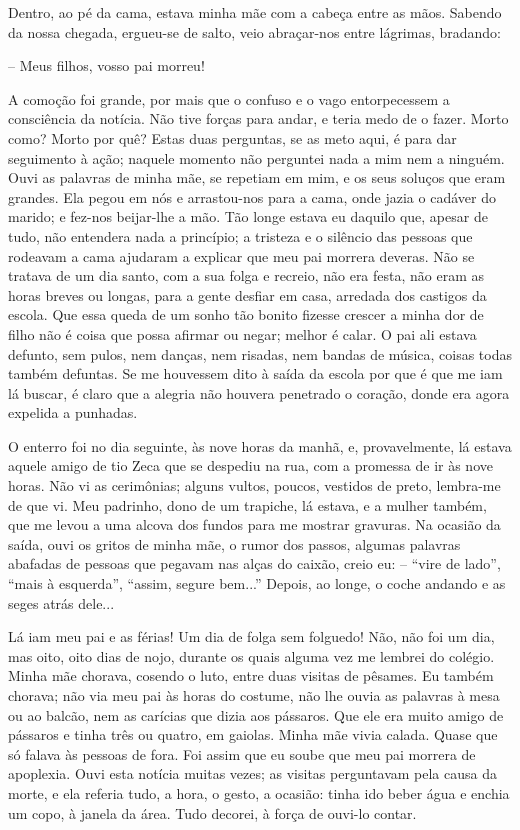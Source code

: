 Dentro, ao pé da cama, estava minha mãe com a cabeça entre as mãos.
Sabendo da nossa chegada, ergueu-se de salto, veio abraçar-nos entre
lágrimas, bradando:

-- Meus filhos, vosso pai morreu!

A comoção foi grande, por mais que o confuso e o vago entorpecessem a
consciência da notícia. Não tive forças para andar, e teria medo de o
fazer. Morto como? Morto por quê? Estas duas perguntas, se as meto aqui,
é para dar seguimento à ação; naquele momento não perguntei nada a mim
nem a ninguém. Ouvi as palavras de minha mãe, se repetiam em mim, e os
seus soluços que eram grandes. Ela pegou em nós e arrastou-nos para a
cama, onde jazia o cadáver do marido; e fez-nos beijar-lhe a mão. Tão
longe estava eu daquilo que, apesar de tudo, não entendera nada a
princípio; a tristeza e o silêncio das pessoas que rodeavam a cama
ajudaram a explicar que meu pai morrera deveras. Não se tratava de um
dia santo, com a sua folga e recreio, não era festa, não eram as horas
breves ou longas, para a gente desfiar em casa, arredada dos castigos da
escola. Que essa queda de um sonho tão bonito fizesse crescer a minha
dor de filho não é coisa que possa afirmar ou negar; melhor é calar. O
pai ali estava defunto, sem pulos, nem danças, nem risadas, nem bandas
de música, coisas todas também defuntas. Se me houvessem dito à saída da
escola por que é que me iam lá buscar, é claro que a alegria não houvera
penetrado o coração, donde era agora expelida a punhadas.

O enterro foi no dia seguinte, às nove horas da manhã, e, provavelmente,
lá estava aquele amigo de tio Zeca que se despediu na rua, com a
promessa de ir às nove horas. Não vi as cerimônias; alguns vultos,
poucos, vestidos de preto, lembra-me de que vi. Meu padrinho, dono de um
trapiche, lá estava, e a mulher também, que me levou a uma alcova dos
fundos para me mostrar gravuras. Na ocasião da saída, ouvi os gritos de
minha mãe, o rumor dos passos, algumas palavras abafadas de pessoas que
pegavam nas alças do caixão, creio eu: -- ``vire de lado'', ``mais à
esquerda'', ``assim, segure bem...'' Depois, ao longe, o coche andando e
as seges atrás dele...

Lá iam meu pai e as férias! Um dia de folga sem folguedo! Não, não foi
um dia, mas oito, oito dias de nojo, durante os quais alguma vez me
lembrei do colégio. Minha mãe chorava, cosendo o luto, entre duas
visitas de pêsames. Eu também chorava; não via meu pai às horas do
costume, não lhe ouvia as palavras à mesa ou ao balcão, nem as carícias
que dizia aos pássaros. Que ele era muito amigo de pássaros e tinha três
ou quatro, em gaiolas. Minha mãe vivia calada. Quase que só falava às
pessoas de fora. Foi assim que eu soube que meu pai morrera de
apoplexia. Ouvi esta notícia muitas vezes; as visitas perguntavam pela
causa da morte, e ela referia tudo, a hora, o gesto, a ocasião: tinha
ido beber água e enchia um copo, à janela da área. Tudo decorei, à força
de ouvi-lo contar.

